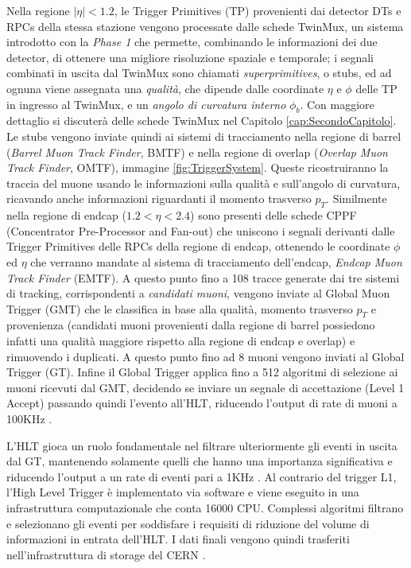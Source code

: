 Nella regione $|\eta| < 1.2$, le Trigger Primitives (TP) provenienti dai detector DTs e RPCs della stessa stazione vengono processate dalle schede TwinMux, un sistema introdotto con la \textit{Phase 1} che permette, combinando le informazioni dei due detector, di ottenere una migliore risoluzione spaziale e temporale; i segnali combinati in uscita dal TwinMux sono chiamati \textit{superprimitives}, o stubs, ed ad ognuna viene assegnata una \textit{qualità}, che dipende dalle coordinate $\eta$ e $\phi$ delle TP in ingresso al TwinMux, e un \textit{angolo di curvatura interno} $\phi_b$. 
Con maggiore dettaglio si discuterà delle schede TwinMux nel Capitolo \ref{cap:SecondoCapitolo}. \newline
Le stubs vengono inviate quindi ai sistemi di tracciamento nella regione di barrel (\textit{Barrel Muon Track Finder}, BMTF) e nella regione di overlap (\textit{Overlap Muon Track Finder}, OMTF), immagine \ref{fig:TriggerSystem}. Queste  ricostruiranno la traccia del muone usando le informazioni sulla qualità e sull'angolo di curvatura, ricavando anche informazioni riguardanti il momento trasverso $p_T$. \newline
Similmente nella regione di endcap ($1.2 < \eta < 2.4$) sono presenti delle schede CPPF (Concentrator Pre-Processor and Fan-out) che uniscono i segnali derivanti dalle Trigger Primitives delle RPCs della regione di endcap, ottenendo le coordinate $\phi$ ed $\eta$ che verranno mandate al sistema di tracciamento dell'endcap, \textit{Endcap Muon Track Finder} (EMTF). \newline
A questo punto fino a 108 tracce generate dai tre sistemi di tracking, corrispondenti a \textit{candidati muoni}, vengono inviate al Global Muon Trigger (GMT) che le classifica in base alla qualità, momento trasverso $p_T$ e provenienza (candidati muoni provenienti dalla regione di barrel possiedono infatti una qualità maggiore rispetto alla regione di endcap e overlap) e rimuovendo i duplicati. A questo punto fino ad 8 muoni vengono inviati al Global Trigger (GT). \newline
Infine il Global Trigger applica fino a 512 algoritmi di selezione ai muoni ricevuti dal GMT, decidendo se inviare un segnale di accettazione (Level 1 Accept) passando quindi l'evento all'HLT, riducendo l'output di rate di muoni a 100KHz \cite{CERNsummerSchool}.

L'HLT gioca un ruolo fondamentale nel filtrare ulteriormente gli eventi in uscita dal GT, mantenendo solamente quelli che hanno una importanza significativa e riducendo l'output a un rate di eventi pari a 1KHz . Al contrario del trigger L1, l'High Level Trigger è implementato via software e viene eseguito in una infrastruttura computazionale che conta 16000 CPU. \newline
Complessi algoritmi filtrano e selezionano gli eventi per soddisfare i requisiti di riduzione del volume di informazioni in entrata dell'HLT. I dati finali vengono quindi trasferiti nell'infrastruttura di storage del CERN \cite{MasterThesisNicLai}.



